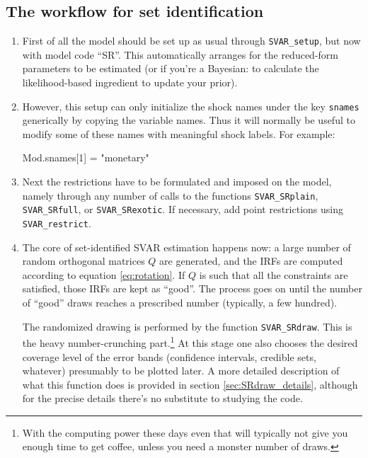 \documentclass[a4paper,10pt]{article}
\newcounter{script}[section]
\begin{document}
\subsection{The workflow for set identification}

\begin{enumerate}
\item First of all the model should be set up as usual through \texttt{SVAR\_setup},
but now with model code ``SR''. This automatically arranges for the reduced-form
parameters to be estimated (or if you're a Bayesian: to calculate the likelihood-based
ingredient to update your prior).
\item However, this setup can only initialize the shock names under the key \texttt{snames}
generically by copying the variable names. Thus it will normally be useful 
to modify some of these names with meaningful shock labels. For example:
\begin{code}
Mod.snames[1] = "monetary"
\end{code}

\item Next the restrictions have to be formulated and imposed on the model,
  namely through any number of calls to the functions \texttt{SVAR\_SRplain},
  \texttt{SVAR\_SRfull}, or \texttt{SVAR\_SRexotic}. If necessary, add point
  restrictions using \texttt{SVAR\_restrict}.

\item The core of set-identified SVAR estimation happens now: a large number of
  random orthogonal matrices $Q$ are generated, and the IRFs are computed
  according to equation \eqref{eq:rotation}. If $Q$ is such that all the
  constraints are satisfied, those IRFs are kept as ``good''.  The process goes
  on until the number of ``good'' draws reaches a prescribed number (typically,
  a few hundred).

  The randomized drawing is performed by the function
  \texttt{SVAR\_SRdraw}. This is the heavy number-crunching part.\footnote{With
    the computing power these days even that will typically not give you enough
    time to get coffee, unless you need a monster number of draws.} At this
  stage one also chooses the desired coverage level of the error bands
  (confidence intervals, credible sets, whatever) presumably to be plotted
  later. A more detailed description of what this function does is provided in
  section \ref{sec:SRdraw_details}, although for the precise details there's no
  substitute to studying the code.


\end{enumerate}
\end{document}
